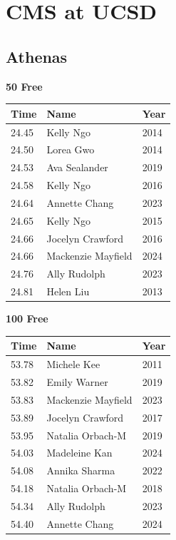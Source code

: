 \vspace{-0.5em}
\clearpage
\section{CMS at UCSD}
\clearpage
\subsection{Athenas}
\vspace{1.2em}
\noindent\begin{minipage}[t]{0.48\textwidth}
\centering
\textbf{\textcolor{teamprimary}{50 Free}}\par
\vspace{0.5em}
\centering
\small
\renewcommand{\arraystretch}{1.0}
\setlength{\tabcolsep}{4pt}
\begin{tabular}{@{}p{1.8cm}p{3.0cm}p{1.0cm}@{}}
\toprule
\textbf{Time} & \textbf{Name} & \textbf{Year} \\
\midrule
24.45 & Kelly Ngo & 2014 \\
24.50 & Lorea Gwo & 2014 \\
24.53 & Ava Sealander & 2019 \\
24.58 & Kelly Ngo & 2016 \\
24.64 & Annette Chang & 2023 \\
24.65 & Kelly Ngo & 2015 \\
24.66 & Jocelyn Crawford & 2016 \\
24.66 & Mackenzie Mayfield & 2024 \\
24.76 & Ally Rudolph & 2023 \\
24.81 & Helen Liu & 2013 \\
\bottomrule
\end{tabular}
\end{minipage}
\hfill
\begin{minipage}[t]{0.48\textwidth}
\centering
\textbf{\textcolor{teamprimary}{100 Free}}\par
\vspace{0.5em}
\centering
\small
\renewcommand{\arraystretch}{1.0}
\setlength{\tabcolsep}{4pt}
\begin{tabular}{@{}p{1.8cm}p{3.0cm}p{1.0cm}@{}}
\toprule
\textbf{Time} & \textbf{Name} & \textbf{Year} \\
\midrule
53.78 & Michele Kee & 2011 \\
53.82 & Emily Warner & 2019 \\
53.83 & Mackenzie Mayfield & 2023 \\
53.89 & Jocelyn Crawford & 2017 \\
53.95 & Natalia Orbach-M & 2019 \\
54.03 & Madeleine Kan & 2024 \\
54.08 & Annika Sharma & 2022 \\
54.18 & Natalia Orbach-M & 2018 \\
54.34 & Ally Rudolph & 2023 \\
54.40 & Annette Chang & 2024 \\
\bottomrule
\end{tabular}
\end{minipage}
